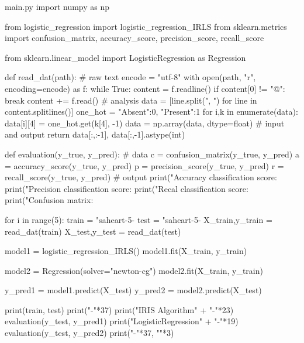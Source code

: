 \documentclass{article}
\begin{document}
\begin{PyListing}{main.py}
import numpy as np

from logistic_regression import logistic_regression_IRLS
from sklearn.metrics import confusion_matrix, accuracy_score, precision_score, recall_score

from sklearn.linear_model import LogisticRegression as Regression


def read_dat(path):
    # raw text
    encode = "utf-8"
    with open(path, "r", encoding=encode) as f:
        while True:
            content = f.readline()
            if content[0] != "@":
                break
        content += f.read()
    # analysis
    data = [line.split(", ") for line in content.splitlines()]
    one_hot = {"Absent":0, "Present":1}
    for i,k in enumerate(data):
        data[i][4] = one_hot.get(k[4], -1)
    data = np.array(data, dtype=float)
    # input and output
    return data[:,:-1], data[:,-1].astype(int)

def evaluation(y_true, y_pred):
    # data
    c = confusion_matrix(y_true, y_pred)
    a = accuracy_score(y_true, y_pred)
    p = precision_score(y_true, y_pred)
    r = recall_score(y_true, y_pred)
    # output
    print("Accuracy classification score:  %
    print("Precision classification score: %
    print("Recal classification score:     %
    print("Confusion matrix:\n%


for i in range(5):
    train = "saheart-5-%
    test  = "saheart-5-%
    X_train,y_train = read_dat(train)
    X_test,y_test   = read_dat(test)

    model1 = logistic_regression_IRLS()
    model1.fit(X_train, y_train)

    model2 = Regression(solver="newton-cg")
    model2.fit(X_train, y_train)

    y_pred1 = model1.predict(X_test)
    y_pred2 = model2.predict(X_test)

    print(train, test)
    print("-"*37)
    print("IRIS Algorithm" + "-"*23)
    evaluation(y_test, y_pred1)
    print("LogisticRegression" + "-"*19)
    evaluation(y_test, y_pred2)
    print("-"*37, "\n"*3)
\end{PyListing}
\end{document}
